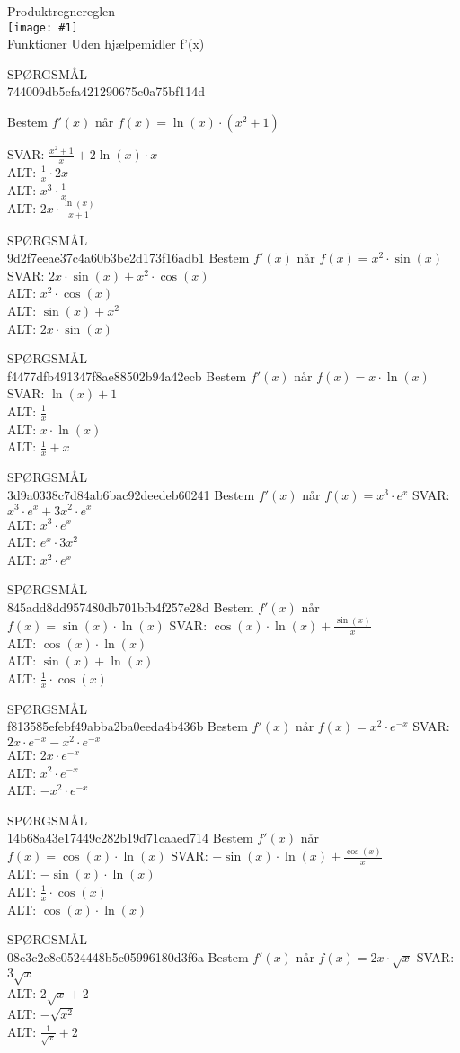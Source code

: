 \documentclass[]{article}
\newcounter{spgcounter}
\newenvironment{question}[2]{\addtocounter{spgcounter}{1} SPØRGSMÅL \thespgcounter\\}{\hspace{50px}}
\newcommand{\name}[1]{{\huge #1}\\}
\newcommand{\tag}[1]{#1}
\newcommand{\cover}[1]{\texttt{[image: \#1]}\\}
\newcommand{\answer}[1]{{\color{green} SVAR: #1}\\}
\newcommand{\alt}[1]{{\color{red} ALT: #1}\\}
\begin{document}
\name{Produktregnereglen}
\cover{produktregneregel.png}
\tag{Funktioner}
\tag{Uden hjælpemidler}
\tag{f'(x)}

\begin{question}{multi}\id{744009db5cfa421290675c0a75bf114d}

Bestem $f'(x)$ når $f(x)=\ln{(x)}\cdot (x^2 + 1)$

\answer{$\frac{x^2+1}{x}+2 \ln{(x)} \cdot x$}
\alt{$\frac{1}{x} \cdot 2x$}
\alt{$x^3 \cdot \frac{1}{x}$}
\alt{$2 x \cdot \frac{\ln{(x)}}{x + 1}$}

\end{question}

\begin{question}{multi}\id{9d2f7eeae37c4a60b3be2d173f16adb1}
Bestem $f'(x)$ når $f(x)=x^2 \cdot \sin(x)$
\answer{$2x \cdot \sin(x) + x^2 \cdot \cos(x)$}
\alt{$x^2 \cdot \cos(x)$}
\alt{$\sin(x) + x^2$}
\alt{$2x \cdot \sin(x)$}
\end{question}
        
\begin{question}{multi}\id{f4477dfb491347f8ae88502b94a42ecb}
Bestem $f'(x)$ når $f(x)=x \cdot \ln(x)$
\answer{$\ln(x) + 1$}
\alt{$\frac{1}{x}$}
\alt{$x \cdot \ln(x)$}
\alt{$\frac{1}{x} + x$}
\end{question}
    
\begin{question}{multi}\id{3d9a0338c7d84ab6bac92deedeb60241}
Bestem $f'(x)$ når $f(x)=x^3 \cdot e^x$
\answer{$x^3 \cdot e^x + 3x^2 \cdot e^x$}
\alt{$x^3 \cdot e^x$}
\alt{$e^x \cdot 3x^2$}
\alt{$x^2 \cdot e^x$}
\end{question}
    
\begin{question}{multi}\id{845add8dd957480db701bfb4f257e28d}
Bestem $f'(x)$ når $f(x)=\sin(x) \cdot \ln(x)$
\answer{$\cos(x) \cdot \ln(x) + \frac{\sin(x)}{x}$}
\alt{$\cos(x) \cdot \ln(x)$}
\alt{$\sin(x) + \ln(x)$}
\alt{$\frac{1}{x} \cdot \cos(x)$}
\end{question}
    
\begin{question}{multi}\id{f813585efebf49abba2ba0eeda4b436b}
Bestem $f'(x)$ når $f(x)=x^2 \cdot e^{-x}$
\answer{$2x \cdot e^{-x} - x^2 \cdot e^{-x}$}
\alt{$2x \cdot e^{-x}$}
\alt{$x^2 \cdot e^{-x}$}
\alt{$-x^2 \cdot e^{-x}$}
\end{question}
    
\begin{question}{multi}\id{14b68a43e17449c282b19d71caaed714}
Bestem $f'(x)$ når $f(x)=\cos(x) \cdot \ln(x)$
\answer{$-\sin(x) \cdot \ln(x) + \frac{\cos(x)}{x}$}
\alt{$-\sin(x) \cdot \ln(x)$}
\alt{$\frac{1}{x} \cdot \cos(x)$}
\alt{$\cos(x) \cdot \ln(x)$}
\end{question}
    
\begin{question}{multi}\id{08c3c2e8e0524448b5c05996180d3f6a}
Bestem $f'(x)$ når $f(x)=2 x \cdot \sqrt{x}$
\answer{$3 \sqrt{x}$}
\alt{$2 \sqrt{x} + 2$}
\alt{$-\sqrt{x^2}$}
\alt{$\frac{1}{\sqrt{x}} + 2$}
\end{question}
\end{document}
